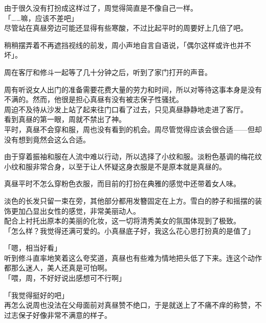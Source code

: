 由于很久没有打扮成这样过了，周觉得简直是不像自己一样。\\

「……嘛，应该不差吧」\\

尽管站在真昼旁边可能还显得有些寒酸，不过比起平时的周要好上几倍了吧。

稍稍摆弄着不再遮挡视线的前发，周小声地自言自语说，「偶尔这样或许也并不坏」。\\

\vspace{2\baselineskip}

周在客厅和修斗一起等了几十分钟之后，听到了家门打开的声音。

周有听说女人出门的准备需要花费大量的劳力和时间，所以对等待这事本身是没有不满的。然而，他很是担心真昼有没有被志保子性骚扰。\\

周迫不及待从沙发上站了起来往门口看了过去，只见真昼静静地走进了客厅。\\

看到真昼的第一眼，周就不禁出了神。\\

平时，真昼不会穿和服，周也没有看到的机会。周尽管觉得应该会很合适——但却没有想到竟然会这么合适。

由于穿着振袖和服在人流中难以行动，所以选择了小纹和服。淡粉色基调的梅花纹小纹和服非常合身，以至于让人怀疑这身衣服是不是原本就是真昼的。

真昼平时不怎么穿粉色衣服，而目前的打扮在典雅的感觉中还带着女人味。

淡色的长发只留一束在旁，其他部分都用发簪固定在上方。雪白的脖子和摇摆的装饰更加凸显出女性的感觉，非常美丽动人。\\

配合上衬托出原本的美丽的化妆，这一切将清秀美女的氛围体现到了极致。\\

「怎么样？我觉得还满可爱的。小真昼底子好，我这么花心思打扮真的是值了」

「嗯，相当好看」\\

听到修斗直率地笑着这么夸奖道，真昼也有些难为情地把头低了下来。连这个动作都那么迷人，美人还真是可怕啊。\\

「喂，周，不好好说出感想可不行啊」

「我觉得挺好的吧」\\

再怎么说周也没法在父母面前对真昼赞不绝口，于是就送上了不痛不痒的称赞，不过志保子好像非常不满意的样子。\\

